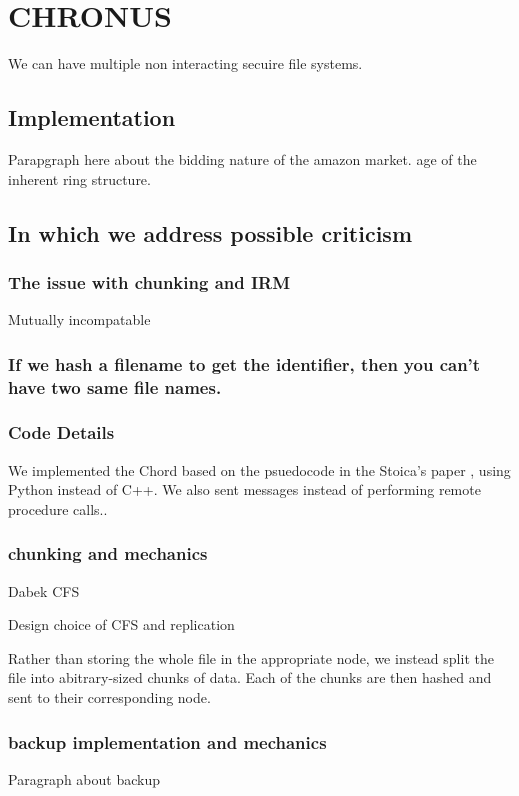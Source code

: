 \documentclass[conference, compsocconf, letterpaper]{IEEEtran}
\begin{document}
\section{CHRONUS}


We can have multiple non interacting secuire file systems.


\subsection{Implementation}
Parapgraph here about the bidding nature of the amazon market.
age of the inherent ring structure.


\subsection{In which we address possible criticism}

\subsubsection{The issue with chunking and IRM}
Mutually incompatable

\subsubsection{If we hash a filename to get the identifier, then you can't have two same file names.}


\subsubsection{Code Details}
We implemented the Chord based on the psuedocode  in the Stoica's paper \cite{Chord}, using Python instead of C++.  We also sent messages instead of performing remote procedure calls..


\subsubsection{chunking and mechanics }

Dabek CFS \cite{CFS}

Design choice of CFS and replication 


Rather than storing the whole file in the appropriate node, we instead split the file into abitrary-sized chunks of data.  Each of the chunks are then hashed and sent to their corresponding node.

\subsubsection{backup implementation and mechanics}
Paragraph about backup
\end{document}
